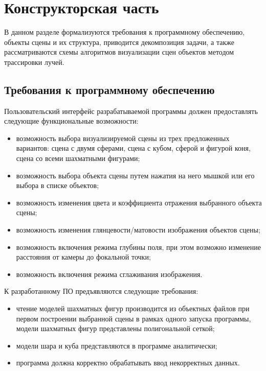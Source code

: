 \chapter{Конструкторская часть}
В данном разделе формализуются требования к программному обеспечению, объекты сцены и их структура, приводится декомпозиция задачи, а также рассматриваются схемы алгоритмов визуализации сцен объектов методом трассировки лучей.

\section{Требования к программному обеспечению}
Пользовательский интерфейс разрабатываемой программы должен предоставлять следующие функциональные возможности:
\begin{itemize}
	\item возможность выбора визуализируемой сцены из трех предложенных вариантов: сцена с двумя сферами, сцена с кубом, сферой и фигурой коня, сцена со всеми шахматными фигурами;
	\item возможность выбора объекта сцены путем нажатия на него мышкой или его выбора в списке объектов;
	\item возможность изменения цвета и коэффициента отражения выбранного объекта сцены;
	\item возможность изменения глянцевости/матовости изображения объектов сцены;
	\item возможность включения режима глубины поля, при этом возможно изменение расстояния от камеры до фокальной точки;
	\item возможность включения режима сглаживания изображения.
\end{itemize}

К разработанному ПО предъявляются следующие требования:
\begin{itemize}
	\item чтение моделей шахматных фигур производится из объектных файлов при первом построении выбранной сцены в рамках одного запуска программы, модели шахматных фигур представлены полигональной сеткой;
	\item модели шара и куба представляются в программе аналитически;
	\item программа должна корректно обрабатывать ввод некорректных данных.
\end{itemize}

